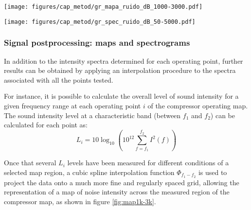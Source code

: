 \begin{figure*}[t!]
\centering
\texttt{[image: figures/cap\_metod/gr\_mapa\_ruido\_dB\_1000-3000.pdf]}
\caption{Sample of noise level in the 1 -- 3 kHz band obtained through the processing described in subsection \ref{sub:noise_maps_and_spectrograms}, including the measured data points $(\circ)$ and the paths later expanded as spectrograms shown in figure \ref{fig:spec50-5k}. The left hand side map represents the inlet duct, whereas the right hand side map represents the outlet duct. }
\label{fig:map1k-3k}
\end{figure*}

\begin{figure*}[t!]
\centering
\texttt{[image: figures/cap\_metod/gr\_spec\_ruido\_dB\_50-5000.pdf]}
\caption{Sample of spectrograms calculated using the procedure outlined in subsection \ref{sub:noise_maps_and_spectrograms}, following the 160 krpm paths marked in figure \ref{fig:map1k-3k}. The 1--3 kHz band selected for the maps in figure \ref{fig:map1k-3k} is highlighted, along with some particular flow phenomena discussed in section \ref{sec:results_and_discussion}.}
\label{fig:spec50-5k}
\end{figure*}

\subsubsection{Signal postprocessing: maps and spectrograms}
\label{sub:noise_maps_and_spectrograms}

In addition to the intensity spectra determined for each operating point, further results can be obtained by applying an interpolation procedure to the spectra associated with all the points tested.

For instance, it is possible to calculate the overall level of sound intensity for a given frequency range at each operating point $i$ of the compressor operating map. The sound intensity level at a characteristic band (between $f_1$ and $f_2$) can be calculated for each point as:
\begin{equation}\label{eq:point_level}
  L_i=10\log_{10}\left(10^{12}\sum_{f=f_1}^{f_2}I^2(f)\right)
\end{equation}

Once that several $L_i$ levels have been measured for different conditions of a selected map region, a cubic spline interpolation function $\Phi_{f_1-f_2}$ is used to project the data onto a much more fine and regularly spaced grid, allowing the representation of a map of noise intensity across the measured region of the compressor map, as shown in figure \ref{fig:map1k-3k}.

